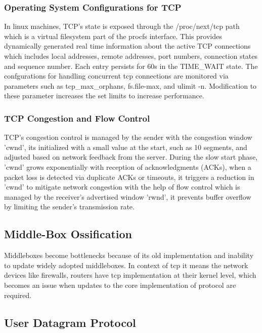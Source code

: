 \subsubsection{Operating System Configurations for TCP}

In linux machines, TCP's state is exposed  through the /proc/next/tcp path which is a virtual filesystem part of the procfs interface. This provides dynamically generated real time information about the active TCP connections which includes local addresses, remote addresses, port numbers, connection states and sequence number. Each entry persists for 60s in the TIME\_WAIT state. The confgurations for handling concurrent tcp connections are monitored via parameters such as tcp\_max\_orphans, fs.file-max, and ulimit -n. Modification to these parameter increases the set limits to increase performance. 


\subsubsection{TCP Congestion and Flow Control}

TCP’s congestion control is managed by the sender with the congestion window 'cwnd', its initialized with a small value at the start, such as 10 segments, and adjusted based on network feedback from the server. During the slow start phase, 'cwnd' grows exponentially with reception of acknowledgments (ACKs), when a packet loss is detected via duplicate ACKs or timeouts, it triggers a reduction in 'cwnd' to mitigate network congestion with the help of flow control which is managed by the receiver’s advertised window 'rwnd', it prevents buffer overflow by limiting the sender’s transmission rate.





\subsection{Middle-Box Ossification}
Middleboxes become bottlenecks because of its old implementation and inability to update widely adopted middleboxes. In context of tcp it means the network devices like firewalls, routers have tcp implementation at their kernel level, which becomes an issue when updates to the core implementation of protocol are required.


\subsection{User Datagram Protocol}

